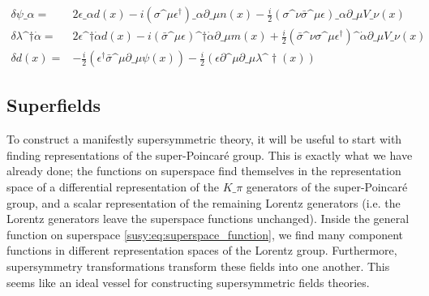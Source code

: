 \documentclass[../main.tex]{subfiles}
\begin{document}
\begin{temporary}
\begin{subequations}
\begin{align}
      \delta \psi\_\alpha =                 & 2\epsilon\_\alpha d(x) - i(\sigma\^\mu \epsilon^\dagger)\_\alpha \partial\_\mu n(x) - \frac{i}{2} (\sigma\^\nu \bar\sigma\^\mu \epsilon)\_\alpha \partial\_\mu V\_\nu(x)                                                                                     \\
      \delta \lambda\^{\dagger\dot\alpha} = & 2\epsilon\^{\dagger\dot\alpha} d(x) - i(\bar\sigma\^\mu \epsilon)\^{\dagger\dot\alpha} \partial\_\mu m(x) + \frac{i}{2} (\bar\sigma\^\nu \sigma\^\mu \epsilon^\dagger)\^{\dot\alpha} \partial\_\mu V\_\nu(x)                                                 \\
      \delta d(x) =                         & -\frac{i}{2} (\epsilon^\dagger \bar\sigma\^\mu \partial\_\mu \psi(x)) - \frac{i}{2} (\epsilon \partial\^\mu \partial\_\mu \lambda\^\dagger(x))
    \end{align}
  \end{subequations}
\end{temporary}


\subsection{Superfields}
To construct a manifestly supersymmetric theory, it will be useful to start with finding representations of the super-Poincaré group.
This is exactly what we have already done; the functions on superspace find themselves in the representation space of a differential representation of the \(K\_\pi\) generators of the super-Poincaré group, and a scalar representation of the remaining Lorentz generators (i.e. the Lorentz generators leave the superspace functions unchanged).
Inside the general function on superspace \cref{susy:eq:superspace_function}, we find many component functions in different representation spaces of the Lorentz group.
Furthermore, supersymmetry transformations transform these fields into one another.
This seems like an ideal vessel for constructing supersymmetric fields theories.
\end{document}
